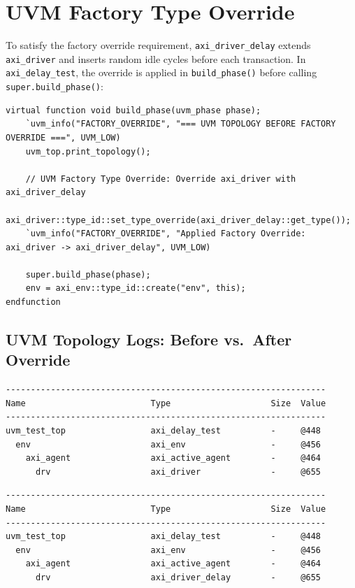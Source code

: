 \documentclass[10pt,a4paper]{article}
\begin{document}
\section{UVM Factory Type Override}
To satisfy the factory override requirement, \texttt{axi\_driver\_delay} extends \texttt{axi\_driver} and inserts random idle cycles before each transaction. In \texttt{axi\_delay\_test}, the override is applied in \texttt{build\_phase()} before calling \texttt{super.build\_phase()}:

\begin{lstlisting}[style=svstyle, caption=Factory Type Override in \texttt{axi\_tests.sv}]
virtual function void build_phase(uvm_phase phase);
    `uvm_info("FACTORY_OVERRIDE", "=== UVM TOPOLOGY BEFORE FACTORY OVERRIDE ===", UVM_LOW)
    uvm_top.print_topology();

    // UVM Factory Type Override: Override axi_driver with axi_driver_delay
    axi_driver::type_id::set_type_override(axi_driver_delay::get_type());
    `uvm_info("FACTORY_OVERRIDE", "Applied Factory Override: axi_driver -> axi_driver_delay", UVM_LOW)

    super.build_phase(phase);
    env = axi_env::type_id::create("env", this);
endfunction
\end{lstlisting}

\subsection{UVM Topology Logs: Before vs.\ After Override}
\begin{lstlisting}[style=logstyle, caption=Topology BEFORE Override]
----------------------------------------------------------------
Name                         Type                    Size  Value
----------------------------------------------------------------
uvm_test_top                 axi_delay_test          -     @448
  env                        axi_env                 -     @456
    axi_agent                axi_active_agent        -     @464
      drv                    axi_driver              -     @655
\end{lstlisting}

\begin{lstlisting}[style=logstyle, caption=Topology AFTER Override]
----------------------------------------------------------------
Name                         Type                    Size  Value
----------------------------------------------------------------
uvm_test_top                 axi_delay_test          -     @448
  env                        axi_env                 -     @456
    axi_agent                axi_active_agent        -     @464
      drv                    axi_driver_delay        -     @655
\end{lstlisting}
\end{document}

